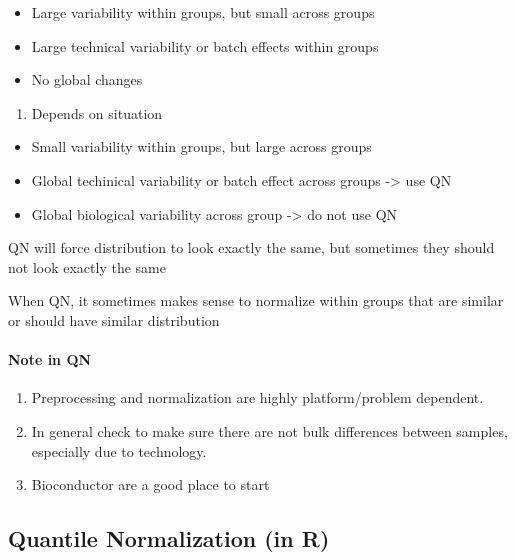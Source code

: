 \documentclass[]{article}
\providecommand{\tightlist}{%
  \setlength{\itemsep}{0pt}\setlength{\parskip}{0pt}}
\let\oldparagraph\paragraph
\renewcommand{\paragraph}[1]{\oldparagraph{#1}\mbox{}}
\begin{document}
\begin{itemize}
\tightlist
\item
  Large variability within groups, but small across groups
\item
  Large technical variability or batch effects within groups
\item
  No global changes
\end{itemize}

\begin{enumerate}
\def\labelenumi{\arabic{enumi}.}
\setcounter{enumi}{2}
\tightlist
\item
  Depends on situation
\end{enumerate}

\begin{itemize}
\tightlist
\item
  Small variability within groups, but large across groups
\item
  Global techinical variability or batch effect across groups
  -\textgreater{} use QN
\item
  Global biological variability across group -\textgreater{} do not use
  QN
\end{itemize}

QN will force distribution to look exactly the same, but sometimes they
should not look exactly the same

When QN, it sometimes makes sense to normalize within groups that are
similar or should have similar distribution

\paragraph{Note in QN}\label{note-in-qn}

\begin{enumerate}
\def\labelenumi{\arabic{enumi}.}
\tightlist
\item
  Preprocessing and normalization are highly platform/problem dependent.
\item
  In general check to make sure there are not bulk differences between
  samples, especially due to technology.
\item
  Bioconductor are a good place to start
\end{enumerate}

\subsection{Quantile Normalization (in
R)}\label{quantile-normalization-in-r}
\end{document}
